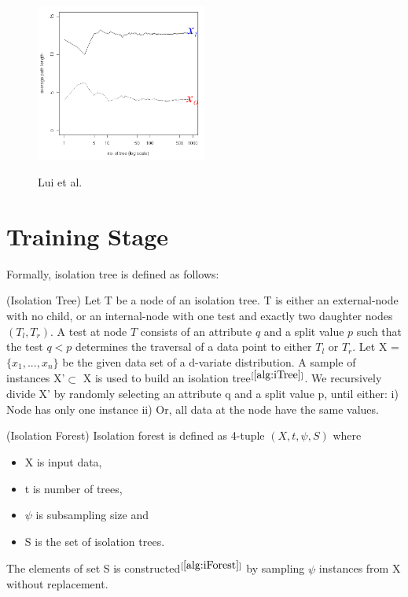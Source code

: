 \vspace{1em}
\begin{figure}[!ht]
    \centering
    \includegraphics[width=0.50\textwidth]{../fig/chapter2/path-length-for-that-point.png}
    
    {Lui et al. \cite{10.1145/2133360.2133363}}
    \label{fig:path-length}
\end{figure}

\section{Training Stage}
\label{sec:iforest-training}

Formally, isolation tree is defined as follows:

\begin{defn}
    \label{defn:isolation-tree}
    (Isolation Tree)
    Let T be a node of an isolation tree.
    T is either an external-node with no child, or an internal-node with one test and exactly two daughter nodes $(T_l, T_r)$.
    A test at node $T$ consists of an attribute $q$ and a split value $p$ such that the test $q < p$ determines the traversal of a data point to either $T_l$ or $T_r$.
    Let X = $\{x_1, ..., x_n\}$ be the given data set of a d-variate distribution.
    A sample of instances X'$\subset$ X is used to build an isolation tree$^{[\ref{alg:iTree}]}$.
    We recursively divide X' by randomly selecting an attribute q and a split value p, until either: i) Node has only one instance ii) Or, all data at the node have the same values.
\end{defn}


\begin{defn}
    \label{defn:isolation-forest}
    (Isolation Forest)
    Isolation forest is defined as 4-tuple $(X, t, \psi, S)$ where
    \vspace{-1em}
    \begin{itemize}
        \setlength\itemsep{-1em}
        \item X is input data,
        \item t is number of trees,
        \item $\psi$ is subsampling size and
        \item S is the set of isolation trees.
    \end{itemize}
    \vspace{-1em}
    The elements of set S is constructed$^{[\ref{alg:iForest}]}$ by sampling $\psi$ instances from X without replacement.
\end{defn}

